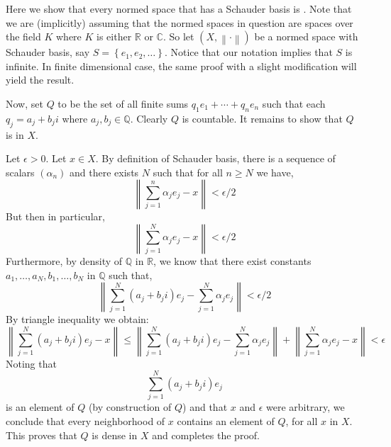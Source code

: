 \documentclass[12pt]{article}
\begin{document}

Here we show that every normed space that has a Schauder basis is
.
Note that we are (implicitly) assuming that the normed spaces in question
are spaces over the field $K$ where $K$ is either $\mathbb{R}$ or $\mathbb{C}$.
So let $(X, \left\|\cdot\right\|)$ be a normed space with Schauder basis,
say $S = \left\{e_1, e_2,\dots\right\}$.
Notice that our notation implies that $S$ is infinite.
In finite dimensional case,
the same proof with a slight modification will yield the result.

Now, set $Q$ to be the set of all finite sums $q_1e_1+\cdots + q_ne_n$
such that each $q_j = a_j + b_ji$ where $a_j, b_j \in \mathbb{Q}$.
Clearly $Q$ is countable.
It remains to show that $Q$ is  in $X$.

Let $\epsilon > 0$. Let $x \in X$.
By definition of Schauder basis,
there is a sequence of scalars $(\alpha_n)$
and there exists $N$ such that for all $n \geq N$ we have,
$$\left\|\sum_{j=1}^{n}\alpha_je_j - x\right\| < \epsilon/2$$
But then in particular,
$$\left\|\sum_{j=1}^{N}\alpha_je_j - x\right\| < \epsilon/2$$
Furthermore, by density of $\mathbb{Q}$ in $\mathbb{R}$,
we know that there exist constants
$a_1,\dots, a_N, b_1,\dots, b_N$ in $\mathbb{Q}$ such that,
$$\left\|\sum_{j=1}^N(a_j + b_ji)e_j - \sum_{j=1}^N\alpha_je_j\right\|<\epsilon/2$$
By triangle inequality we obtain:
$$\left\|\sum_{j=1}^N(a_j + b_ji)e_j - x\right\| \leq \left\|\sum_{j=1}^N(a_j + b_ji)e_j - \sum_{j=1}^N\alpha_je_j\right\| + \left\|\sum_{j=1}^{N}\alpha_je_j - x\right\| < \epsilon$$
Noting that
$$\sum_{j=1}^N(a_j + b_ji)e_j$$ is an element of $Q$ (by construction of $Q$)
and that $x$ and $\epsilon$ were arbitrary,
we conclude that every neighborhood of $x$ contains an element of $Q$,
for all $x$ in $X$.
This proves that $Q$ is dense in $X$ and completes the proof.
\end{document}
